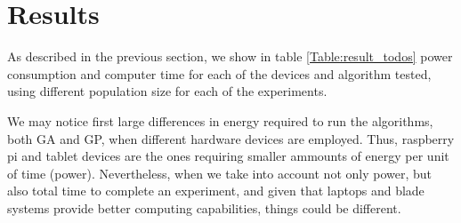 \section{Results}
\label{results}

As described in the previous section, we show in table \ref{Table:result_todos} power consumption and computer time for each of the devices and algorithm tested, using different population size for each of the experiments.

We may notice first large differences in energy required to run the algorithms, both GA and GP, when different hardware devices are employed.  Thus, raspberry pi and tablet devices are the ones requiring smaller ammounts of energy per unit of time (power).  Nevertheless, when we take into account not only power, but also total time to complete an experiment, and given that laptops and blade systems provide better computing capabilities, things could be different.









